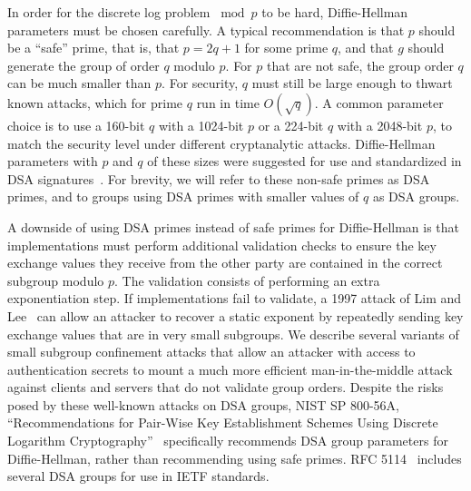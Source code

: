 
%

In order for the discrete log problem $\bmod p$ to be hard, Diffie-Hellman parameters
must be chosen carefully. A typical recommendation is that $p$ should be a
``safe'' prime, that is, that $p = 2q+1$ for some prime $q$, and that $g$
should generate the group of order $q$ modulo $p$. For $p$ that are not safe,
the group order $q$ can be much smaller than $p$. For security, $q$ must still
be large enough to thwart known attacks, which for prime $q$ run in time
$O(\sqrt{q})$. A common parameter choice is to use a 160-bit $q$ with a
1024-bit $p$ or a 224-bit $q$ with a 2048-bit $p$, to match the security level
under different cryptanalytic attacks. Diffie-Hellman parameters with $p$ and
$q$ of these sizes were suggested for use and standardized in DSA
signatures~\cite{fips186}. For brevity, we will refer to these non-safe primes as
DSA primes, and to groups using DSA primes with smaller values of $q$ as  DSA
groups.

A downside of using DSA primes instead of safe primes for Diffie-Hellman is
that implementations must perform additional validation checks to ensure the
key exchange values they receive from the other party are contained in the
correct subgroup modulo $p$. The validation consists of performing an extra
exponentiation step. If implementations fail to validate, a 1997 attack of Lim
and Lee~\cite{lim-1997} can allow an attacker to recover a static exponent by
repeatedly sending key exchange values that are in very small subgroups. We
describe several variants of small subgroup confinement attacks that allow an
attacker with access to authentication secrets to mount a much more efficient
man-in-the-middle attack against clients and servers that do not validate group
orders. Despite the risks posed by these well-known attacks on DSA groups, NIST SP 800-56A, ``Recommendations
for Pair-Wise Key Establishment Schemes Using Discrete Logarithm
Cryptography''~\cite{sp800} specifically recommends DSA group parameters
for Diffie-Hellman, rather than recommending using safe primes. RFC
5114~\cite{rfc5114} includes several DSA groups for use in IETF standards.

